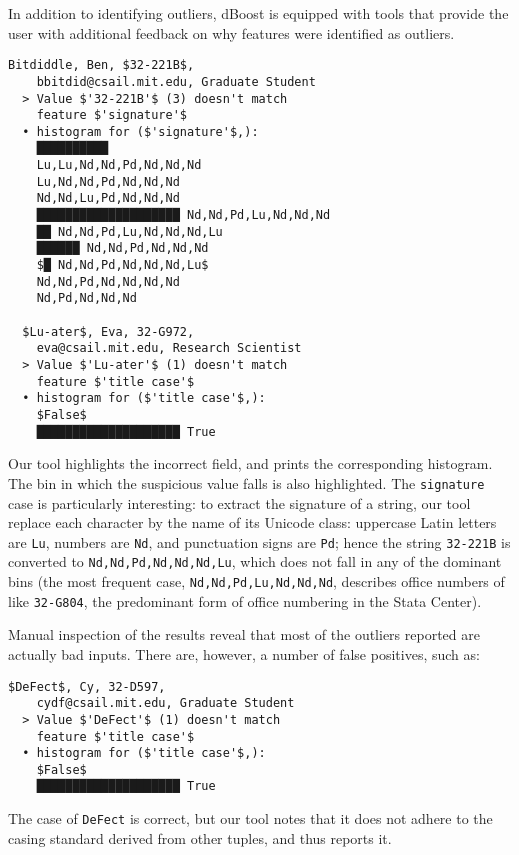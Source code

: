%


In addition to identifying outliers, dBoost is equipped with tools that provide the user with additional feedback on why features were identified as outliers.

\begin{lstlisting}[gobble=2]
  Bitdiddle, Ben, $32-221B$,
    bbitdid@csail.mit.edu, Graduate Student
  > Value $'32-221B'$ (3) doesn't match
    feature $'signature'$
  • histogram for ($'signature'$,):
    ██████████
    Lu,Lu,Nd,Nd,Pd,Nd,Nd,Nd
    Lu,Nd,Nd,Pd,Nd,Nd,Nd
    Nd,Nd,Lu,Pd,Nd,Nd,Nd
    ████████████████████ Nd,Nd,Pd,Lu,Nd,Nd,Nd
    ██ Nd,Nd,Pd,Lu,Nd,Nd,Nd,Lu
    ██████ Nd,Nd,Pd,Nd,Nd,Nd
    $█ Nd,Nd,Pd,Nd,Nd,Nd,Lu$
    Nd,Nd,Pd,Nd,Nd,Nd,Nd
    Nd,Pd,Nd,Nd,Nd

  $Lu-ater$, Eva, 32-G972,
    eva@csail.mit.edu, Research Scientist
  > Value $'Lu-ater'$ (1) doesn't match
    feature $'title case'$
  • histogram for ($'title case'$,):
    $False$
    ████████████████████ True
\end{lstlisting}

Our tool highlights the incorrect field, and prints the corresponding histogram. The bin in which the suspicious value falls is also highlighted. The \lstinline{signature} case is particularly interesting: to extract the signature of a string, our tool replace each character by the name of its Unicode class: uppercase Latin letters are \lstinline{Lu}, numbers are \lstinline{Nd}, and punctuation signs are \lstinline{Pd}; hence the string \lstinline{32-221B} is converted to \lstinline{Nd,Nd,Pd,Nd,Nd,Nd,Lu}, which does not fall in any of the dominant bins (the most frequent case, \lstinline{Nd,Nd,Pd,Lu,Nd,Nd,Nd}, describes office numbers of like \lstinline{32-G804}, the predominant form of office numbering in the Stata Center).

Manual inspection of the results reveal that most of the outliers reported are actually bad inputs. There are, however, a number of false positives, such as:

\begin{lstlisting}[gobble=2]
  $DeFect$, Cy, 32-D597,
    cydf@csail.mit.edu, Graduate Student
  > Value $'DeFect'$ (1) doesn't match
    feature $'title case'$
  • histogram for ($'title case'$,):
    $False$
    ████████████████████ True
\end{lstlisting}

The case of \lstinline{DeFect} is correct, but our tool notes that it does not adhere to the casing standard derived from other tuples, and thus reports it.

